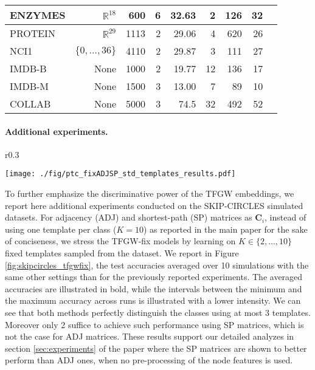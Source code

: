 \documentclass{article}
\def\mC{{\bm{C}}}
\newcommand{\R}{\mathbb{R}}
\begin{document}
{\begin{table}[!t]
{\begin{tabular}{|l|r|r|r|r|r|r|r|r}
			ENZYMES& $\R^{18}$ & 600 & 6& 32.63 & 2 & 126 & 32 \\ \hline
			PROTEIN& $\R^{29}$ & 1113& 2 & 29.06& 4 & 620& 26\\ \hline
			NCI1 &$\{0,...,36\}$ & 4110& 2 & 29.87& 3 & 111& 27\\ \hline
			IMDB-B &     None &  1000   &  2 & 19.77 & 12 & 136 & 17\\ \hline
			IMDB-M &     None & 1500 & 3 & 13.00 &  7 & 89 & 10  \\ \hline
			COLLAB & None & 5000 & 3 & 74.5 & 32& 492 & 52 \\\hline
	\end{tabular}}
\end{table}

\paragraph{Additional experiments.} \begin{wrapfigure}{r}{0.3\textwidth}  \vspace{-7mm}
	\begin{center}
		\texttt{[image: ./fig/ptc\_fixADJSP\_std\_templates\_results.pdf]}
	\end{center}
	\vspace{-5mm}
	\caption{\label{fig:skipcircles_tfgwfix} Test accuracies on SKIP-CIRCLES of TFGW-fix for $K \in \{2,..., 10\}$.} 
\end{wrapfigure}
To further emphasize the discriminative power of the TFGW embeddings, we report here additional experiments conducted on the SKIP-CIRCLES simulated datasets. For adjacency (ADJ) and shortest-path (SP) matrices as $\mC_i$, instead of using one template per class ($K=10$) as reported in the main paper for the sake of conciseness, we stress the TFGW-fix models by learning on $K \in \{2,...,10\}$ fixed templates sampled from the dataset. We report in Figure \ref{fig:skipcircles_tfgwfix}, the test accuracies averaged over 10 simulations with the same other settings than for the previously reported experiments. The averaged accuracies are illustrated in bold, while the intervals between the minimum and the maximum accuracy across runs is illustrated with a lower intensity. We can see that both methods perfectly distinguish the classes using at most 3 templates. Moreover only 2 suffice to achieve such performance using SP matrices, which is not the case for ADJ matrices. These results support our detailed analyzes in section \ref{sec:experiments} of the paper where the SP matrices are shown to better perform than ADJ ones, when no pre-processing of the node features is used.
}
\end{document}
